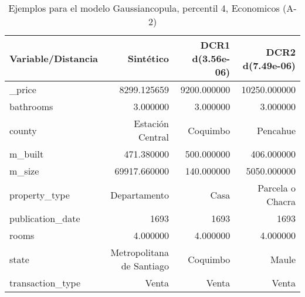 \begin{table}[H]
\centering
\fontsize{10}{14}\selectfont
\caption{Ejemplos para el modelo Gaussiancopula, percentil 4, Economicos (A-2)}
\label{table-example-economicos-a-2-gaussiancopula-4p}
\begin{tabular}{|l|r|r|r|}
\hline
\rowcolor[gray]{0.8}
Variable/Distancia & Sintético & DCR1 d(3.56e-06) & DCR2 d(7.49e-06) \\
\hline \_price & \cellcolor[rgb]{0.9, 0.54, 0.52} 8299.125659 & 9200.000000 & 10250.000000 \\
\hline bathrooms & \cellcolor[rgb]{0.9, 0.54, 0.52} 3.000000 & \cellcolor[rgb]{0.9, 0.54, 0.52} 3.000000 & \cellcolor[rgb]{0.9, 0.54, 0.52} 3.000000 \\
\hline county & \cellcolor[rgb]{0.9, 0.54, 0.52} Estación Central & Coquimbo & Pencahue \\
\hline m\_built & \cellcolor[rgb]{0.9, 0.54, 0.52} 471.380000 & 500.000000 & 406.000000 \\
\hline m\_size & \cellcolor[rgb]{0.9, 0.54, 0.52} 69917.660000 & 140.000000 & 5050.000000 \\
\hline property\_type & \cellcolor[rgb]{0.9, 0.54, 0.52} Departamento & Casa & Parcela o Chacra \\
\hline publication\_date & \cellcolor[rgb]{0.9, 0.54, 0.52} 1693 & \cellcolor[rgb]{0.9, 0.54, 0.52} 1693 & \cellcolor[rgb]{0.9, 0.54, 0.52} 1693 \\
\hline rooms & \cellcolor[rgb]{0.9, 0.54, 0.52} 4.000000 & \cellcolor[rgb]{0.9, 0.54, 0.52} 4.000000 & \cellcolor[rgb]{0.9, 0.54, 0.52} 4.000000 \\
\hline state & \cellcolor[rgb]{0.9, 0.54, 0.52} Metropolitana de Santiago & Coquimbo & Maule \\
\hline transaction\_type & \cellcolor[rgb]{0.9, 0.54, 0.52} Venta & \cellcolor[rgb]{0.9, 0.54, 0.52} Venta & \cellcolor[rgb]{0.9, 0.54, 0.52} Venta \\
\hline
\end{tabular}
\end{table}
